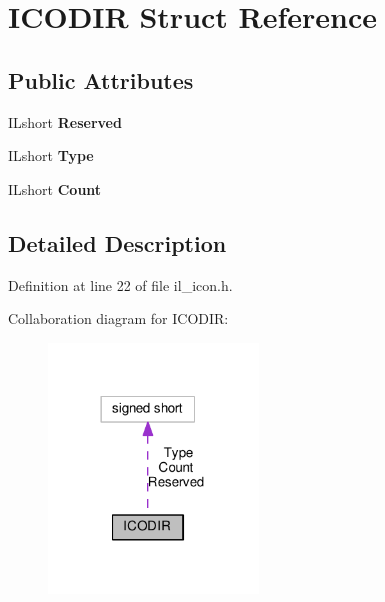 \hypertarget{structICODIR}{}\section{I\+C\+O\+D\+IR Struct Reference}
\label{structICODIR}
\subsection*{Public Attributes}
\begin{DoxyCompactItemize}
\item 
\mbox{\label{structICODIR_a8a3d9b9d365ac46e7fb92fe7796a6aa1}} 
I\+Lshort {\bfseries Reserved}
\item 
\mbox{\label{structICODIR_a1e988e817ee96acc804e4f8f7efba71c}} 
I\+Lshort {\bfseries Type}
\item 
\mbox{\label{structICODIR_ab59b4421e225014f17a76b647cda4b58}} 
I\+Lshort {\bfseries Count}
\end{DoxyCompactItemize}


\subsection{Detailed Description}


Definition at line 22 of file il\+\_\+icon.\+h.



Collaboration diagram for I\+C\+O\+D\+IR\+:
\nopagebreak
\begin{figure}[H]
\begin{center}
\leavevmode
\includegraphics[width=158pt]{db/d11/structICODIR__coll__graph}
\end{center}
\end{figure}


